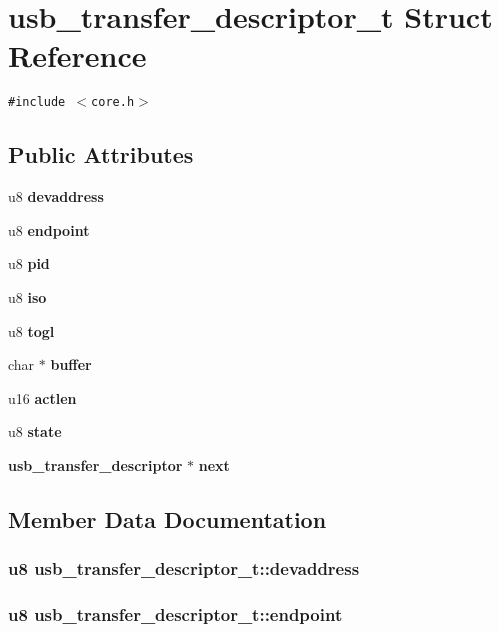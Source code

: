 \section{usb\_\-transfer\_\-descriptor\_\-t Struct Reference}
\label{structusb__transfer__descriptor__t}
{\tt \#include $<$core.h$>$}

\subsection*{Public Attributes}
\begin{CompactItemize}
\item 
u8 {\bf devaddress}
\item 
u8 {\bf endpoint}
\item 
u8 {\bf pid}
\item 
u8 {\bf iso}
\item 
u8 {\bf togl}
\item 
char $\ast$ {\bf buffer}
\item 
u16 {\bf actlen}
\item 
u8 {\bf state}
\item 
{\bf usb\_\-transfer\_\-descriptor} $\ast$ {\bf next}
\end{CompactItemize}


\subsection{Member Data Documentation}
\subsubsection{\setlength{\rightskip}{0pt plus 5cm}u8 {\bf usb\_\-transfer\_\-descriptor\_\-t::devaddress}}\label{structusb__transfer__descriptor__t_70d1338bd8d501e9e082742044a1e837}


\subsubsection{\setlength{\rightskip}{0pt plus 5cm}u8 {\bf usb\_\-transfer\_\-descriptor\_\-t::endpoint}}\label{structusb__transfer__descriptor__t_00d4d2b626a467350fc21a4d25e7fa3a}


